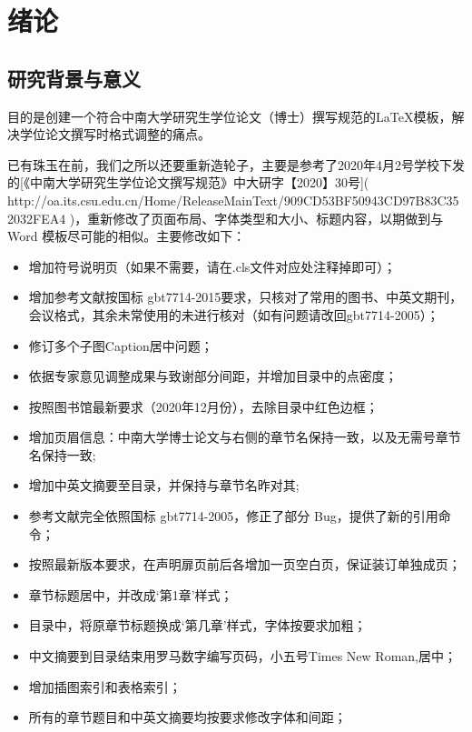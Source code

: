 \section{绪论}
\subsection{研究背景与意义}

目的是创建一个符合中南大学研究生学位论文（博士）撰写规范的LaTeX模板，解决学位论文撰写时格式调整的痛点。

已有珠玉在前，我们之所以还要重新造轮子，主要是参考了2020年4月2号学校下发的[《中南大学研究生学位论文撰写规范》中大研字【2020】30号]( http://oa.its.csu.edu.cn/Home/ReleaseMainText/909CD53BF50943CD97B83C352032FEA4 )，重新修改了页面布局、字体类型和大小、标题内容，以期做到与 Word 模板尽可能的相似。主要修改如下：
\begin{itemize}
\item 增加符号说明页（如果不需要，请在.cls文件对应处注释掉即可）；
\item  增加参考文献按国标 gbt7714-2015要求，只核对了常用的图书、中英文期刊，会议格式，其余未常使用的未进行核对（如有问题请改回gbt7714-2005）；
\item  修订多个子图Caption居中问题；
\item 依据专家意见调整成果与致谢部分间距，并增加目录中的点密度；
\item 按照图书馆最新要求（2020年12月份），去除目录中红色边框；
\item 增加页眉信息：中南大学博士论文与右侧的章节名保持一致，以及无需号章节名保持一致;
\item 增加中英文摘要至目录，并保持与章节名昨对其;
\item 参考文献完全依照国标 gbt7714-2005，修正了部分 Bug，提供了新的引用命令；
\item 按照最新版本要求，在声明扉页前后各增加一页空白页，保证装订单独成页；
\item 章节标题居中，并改成‘第1章’样式；
\item 目录中，将原章节标题换成‘第几章’样式，字体按要求加粗；
\item 中文摘要到目录结束用罗马数字编写页码，小五号Times New Roman,居中；
\item 增加插图索引和表格索引；
\item 所有的章节题目和中英文摘要均按要求修改字体和间距；
\end{itemize}

